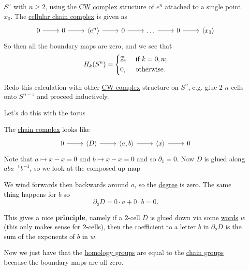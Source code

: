 \begin{eg}
	\(S^n\) with \(n \geq 2\), using the \hyperref[def:CW-Complex]{CW complex} structure of \(e^n\) attached to a single point \(x_0\). The \hyperref[def:cellular-chain-complex]{cellular chain complex} is given as
	\[
		\begin{tikzcd}
			0 & 0 & {\left<e^n\right>} & 0 & \ldots & 0 & {\left<x_0\right>}
			\arrow[from=1-1, to=1-2]
			\arrow[from=1-2, to=1-3]
			\arrow[from=1-3, to=1-4]
			\arrow[from=1-4, to=1-5]
			\arrow[from=1-5, to=1-6]
			\arrow[from=1-6, to=1-7]
		\end{tikzcd}
	\]
	So then all the boundary maps are zero, and we see that
	\[
		H_k(S^n) = \begin{dcases}
			\mathbb{\MakeUppercase{z}}, & \text{ if } k=0, n ; \\
			0,                          & \text{ otherwise}.
		\end{dcases}
	\]
\end{eg}

\begin{exercise}
	Redo this calculation with other \hyperref[def:CW-Complex]{CW complex} structure on \(S^n\), e.g. glue \(2\) \(n\)-cells onto \(S^{n - 1}\) and proceed inductively.
\end{exercise}

\begin{eg}
	Let's do this with the torus
	\begin{figure}[H]
		\centering
		\label{fig:eg:lec31:CW-complex-torus}
	\end{figure}

	The \hyperref[def:cellular-chain-complex]{chain complex} looks like
	\[
		\begin{tikzcd}
			0 & {\left<D\right>} & {\left<a, b\right>} & {\left<x\right>} & 0
			\arrow[from=1-1, to=1-2]
			\arrow[from=1-2, to=1-3]
			\arrow[from=1-3, to=1-4]
			\arrow[from=1-4, to=1-5]
		\end{tikzcd}
	\]
	Note that \(a \mapsto x - x = 0\) and \(b \mapsto x - x = 0\) and so \(\partial_1 = 0\). Now \(D\) is glued along \(aba^{-1}b^{-1}\), so we look at the composed up map

	\begin{figure}[H]
		\centering
		\label{fig:eg:cellular-homology-calc-torus}
	\end{figure}
	We wind forwards then backwards around $a$, so the \hyperref[def:degree]{degree} is zero. The same thing happens for $b$ so
	\[
		\partial_2 D = 0 \cdot a + 0 \cdot b = 0.
	\]

	This gives a nice \textbf{principle}, namely if a \(2\)-cell \(D\) is glued down via some \hyperref[def:word]{words} \(w\) (this only makes sense for \(2\)-cells), then the
	coefficient to a letter \(b\) in \(\partial_2 D\) is the sum of the exponents of \(b\) in \(w\).

	Now we just have that the \hyperref[def:cellular-homology-group]{homology groups} are equal to the \hyperref[def:cellular-chain-complex]{chain groups} because the boundary maps are all zero.
\end{eg}

